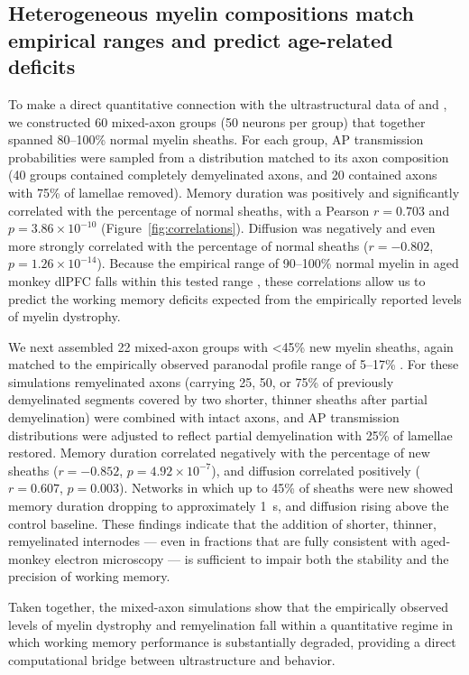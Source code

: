 \documentclass[11pt]{article}
\begin{document}
\subsection{Heterogeneous myelin compositions match empirical ranges and predict age-related deficits}

To make a direct quantitative connection with the ultrastructural data of \citet{peters2002aging} and \citet{peters2003remyelination}, we constructed 60 mixed-axon groups (50 neurons per group) that together spanned 80--100\% normal myelin sheaths. For each group, AP transmission probabilities were sampled from a distribution matched to its axon composition (40 groups contained completely demyelinated axons, and 20 contained axons with 75\% of lamellae removed). Memory duration was positively and significantly correlated with the percentage of normal sheaths, with a Pearson $r = 0.703$ and $p = 3.86 \times 10^{-10}$ (Figure~\ref{fig:correlations}). Diffusion was negatively and even more strongly correlated with the percentage of normal sheaths ($r = -0.802$, $p = 1.26 \times 10^{-14}$). Because the empirical range of 90--100\% normal myelin in aged monkey dlPFC falls within this tested range \citep{peters2002aging}, these correlations allow us to predict the working memory deficits expected from the empirically reported levels of myelin dystrophy.

We next assembled 22 mixed-axon groups with <45\% new myelin sheaths, again matched to the empirically observed paranodal profile range of 5--17\% \citep{peters2003remyelination}. For these simulations remyelinated axons (carrying 25, 50, or 75\% of previously demyelinated segments covered by two shorter, thinner sheaths after partial demyelination) were combined with intact axons, and AP transmission distributions were adjusted to reflect partial demyelination with 25\% of lamellae restored. Memory duration correlated negatively with the percentage of new sheaths ($r = -0.852$, $p = 4.92 \times 10^{-7}$), and diffusion correlated positively ($r = 0.607$, $p = 0.003$). Networks in which up to 45\% of sheaths were new showed memory duration dropping to approximately 1~s, and diffusion rising above the control baseline. These findings indicate that the addition of shorter, thinner, remyelinated internodes --- even in fractions that are fully consistent with aged-monkey electron microscopy --- is sufficient to impair both the stability and the precision of working memory.

Taken together, the mixed-axon simulations show that the empirically observed levels of myelin dystrophy and remyelination fall within a quantitative regime in which working memory performance is substantially degraded, providing a direct computational bridge between ultrastructure and behavior.
\end{document}
